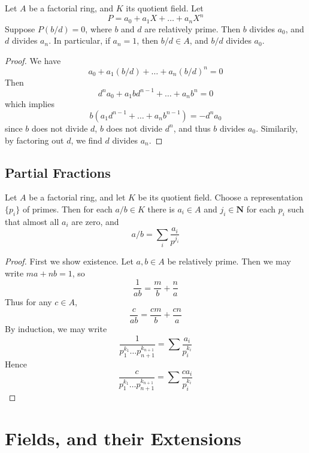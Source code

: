 \begin{theorem}
    Let $A$ be a factorial ring, and $K$ its quotient field. Let
    \[ P = a_0 + a_1 X + \dots + a_n X^n \]
    Suppose $P(b/d) = 0$, where $b$ and $d$ are relatively prime. Then $b$ divides $a_0$, and $d$ divides $a_n$. In particular, if $a_n = 1$, then $b/d \in A$, and $b/d$ divides $a_0$.
\end{theorem}
\begin{proof}
    We have
    \[ a_0 + a_1 (b/d) + \dots + a_n (b/d)^n = 0 \]
    Then
    \[ d^n a_0 + a_1 b d^{n-1} + \dots + a_n b^n = 0 \]
    which implies
    \[ b(a_1 d^{n-1} + \dots + a_n b^{n-1}) = -d^n a_0 \]
    since $b$ does not divide $d$, $b$ does not divide $d^n$, and thus $b$ divides $a_0$. Similarily, by factoring out $d$, we find $d$ divides $a_n$.
\end{proof}



\section{Partial Fractions}

\begin{theorem}
    Let $A$ be a factorial ring, and let $K$ be its quotient field. Choose a representation $\{ p_i \}$ of primes. Then for each $a/b \in K$ there is $a_i \in A$ and $j_i \in \mathbf{N}$ for each $p_i$ such that almost all $a_i$ are zero, and
    \[ a/b = \sum_i \frac{a_i}{p^{j_i}} \]
\end{theorem}
\begin{proof}
    First we show existence. Let $a,b \in A$ be relatively prime. Then we may write $ma + nb = 1$, so
    \[ \frac{1}{ab} = \frac{m}{b} + \frac{n}{a} \]
    Thus for any $c \in A$,
    \[ \frac{c}{ab} = \frac{cm}{b} + \frac{cn}{a} \]
    By induction, we may write
    \[  \frac{1}{p_1^{k_1} \dots p_{n+1}^{k_{n+1}}} = \sum \frac{a_i}{p_i^{k_i}} \]
    Hence
    \[ \frac{c}{p_1^{k_1} \dots p_{n+1}^{k_{n+1}}} = \sum \frac{c a_i}{p_i^{k_i}} \]
\end{proof}







\chapter{Fields, and their Extensions}

